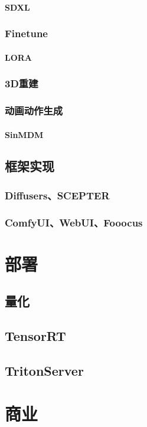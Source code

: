 \documentclass[lang=cn,newtx,10pt,scheme=chinese]{elegantbook}
\begin{document}
\subsubsection{SDXL}
\subsection{Finetune}
\subsubsection{LORA}
\subsection{3D重建}
\subsection{动画动作生成}
\subsubsection{SinMDM}

\section{框架实现}
\subsection{Diffusers、SCEPTER}
\subsection{ComfyUI、WebUI、Fooocus}




\chapter{部署}
\section{量化}
\section{TensorRT}
\section{TritonServer}

\chapter{商业}
\end{document}
